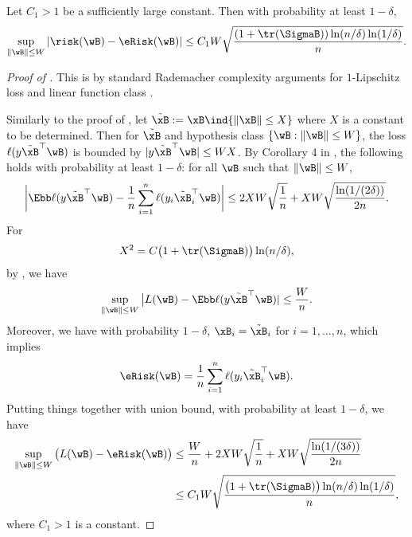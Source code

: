 \documentclass[11pt]{article}
\begin{document}
\begin{lemma}\label{lemma:rad-concentration}
Let $C_1>1$ be a sufficiently large constant. 
Then with probability at least $1-\delta$, 
\begin{align*}
\sup_{\|\wB\|\le W}    |\risk(\wB)-\eRisk(\wB)| \le C_1 W \sqrt{\frac{ (1+\tr(\SigmaB))\ln(n/\delta)\ln(1/\delta)}{n}}.
\end{align*}
\end{lemma}
\begin{proof}[Proof of ]
This is by standard Rademacher complexity arguments for $1$-Lipschitz loss and linear function class \citep{bartlett2002rademacher,kakade2008complexity}.

Similarly to the proof of , let $\tilde\xB:= \xB\ind{\|\xB\|\le X}$ where $X$ is a constant to be determined. 
Then for $\tilde\xB$ and hypothesis class $\{\wB: \|\wB\|\le W\}$, the loss $\ell(y\tilde\xB^\top \wB)$ is bounded by $|y\tilde\xB^\top \wB|\le WX$. By Corollary 4 in \citep{kakade2008complexity}, the following holds with probability at least $1-\delta$:
for all $\wB$ such that $\|\wB\|\le W$,
\begin{align*}
    \bigg| \Ebb\ell(y\tilde\xB^\top \wB) - \frac{1}{n}\sum_{i=1}^n \ell(y_i\tilde\xB_i^\top\wB) \bigg| 
    \le  2XW\sqrt{\frac{1}{n}} + XW\sqrt{\frac{\ln(1/(2\delta))}{2n}}.
\end{align*}
For
\[
X^2 = C\big(1+\tr(\SigmaB)\big)\ln(n /\delta),
\]
by , we have 
\[
\sup_{\|\wB\|\le W} \big| L(\wB) - \Ebb\ell(y\tilde\xB^\top \wB) | \le \frac{W}{n}.
\]
Moreover, we have with probability $1-\delta$, $\xB_i=\tilde\xB_i$ for $i=1,\dots,n$, which implies \[\eRisk(\wB) = \frac{1}{n}\sum_{i=1}^n \ell(y_i\tilde\xB_i^\top\wB) .\]
Putting things together with union bound, with probability at least $1-\delta$, we have 
\begin{align*}
\sup_{\|\wB\|\le W} \big(   L(\wB) - \eRisk(\wB) \big) 
&\le \frac{W}{n} +  2XW\sqrt{\frac{1}{n}} + XW\sqrt{\frac{\ln(1/(3\delta))}{2n}} \\
&\le C_1 W \sqrt{\frac{\big(1+\tr(\SigmaB)\big)\ln(n/\delta)\ln(1/\delta)}{n}},
\end{align*}
where $C_1 >1$ is a constant.
\end{proof}
\end{document}
